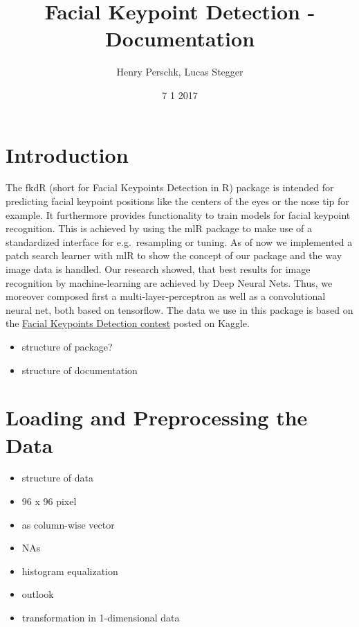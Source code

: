 \documentclass[]{article}
\title{Facial Keypoint Detection - Documentation}
\author{Henry Perschk, Lucas Stegger}
\date{7 1 2017}
\providecommand{\tightlist}{%
  \setlength{\itemsep}{0pt}\setlength{\parskip}{0pt}}
\begin{document}
\maketitle

{
\setcounter{tocdepth}{3}
\tableofcontents
}
\section{Introduction}\label{introduction}

The fkdR (short for Facial Keypoints Detection in R) package is intended
for predicting facial keypoint positions like the centers of the eyes or
the nose tip for example. It furthermore provides functionality to train
models for facial keypoint recognition. This is achieved by using the
mlR package to make use of a standardized interface for e.g.~resampling
or tuning. As of now we implemented a patch search learner with mlR to
show the concept of our package and the way image data is handled. Our
research showed, that best results for image recognition by
machine-learning are achieved by Deep Neural Nets. Thus, we moreover
composed first a multi-layer-perceptron as well as a convolutional
neural net, both based on tensorflow. The data we use in this package is
based on the
\href{https://www.kaggle.com/c/facial-keypoints-detection}{Facial
Keypoints Detection contest} posted on Kaggle.

\begin{itemize}
\tightlist
\item
  structure of package?
\item
  structure of documentation
\end{itemize}

\section{Loading and Preprocessing the
Data}\label{loading-and-preprocessing-the-data}

\begin{itemize}
\tightlist
\item
  structure of data
\item
  96 x 96 pixel
\item
  as column-wise vector
\item
  NAs
\item
  histogram equalization
\item
  outlook
\item
  transformation in 1-dimensional data
\end{itemize}
\end{document}
